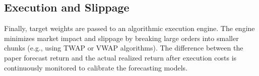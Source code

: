 \subsection{Execution and Slippage}
Finally, target weights are passed to an algorithmic execution engine. The engine minimizes market impact and slippage by breaking large orders into smaller chunks (e.g., using TWAP or VWAP algorithms). The difference between the paper forecast return and the actual realized return after execution costs is continuously monitored to calibrate the forecasting models.


